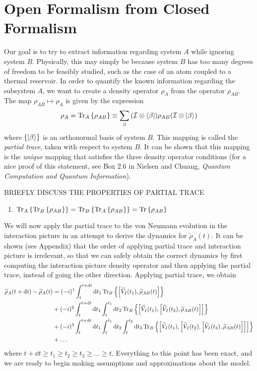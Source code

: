 \documentclass[aps, prl, preprint]{revtex4-1}
\newcommand{\ten}{\otimes}
\newcommand{\Tra}[1]{\Tr\left\{#1\right\}}
\newcommand{\Ptra}[2]{\Tr_{#1}\left\{#2\right\}}
\newcommand{\til}[1]{\widetilde{#1}}
\newcommand{\I}{\mathcal{I}}
\begin{document}
\section{Open Formalism from Closed Formalism}

Our goal is to try to extract information regarding system $A$ while ignoring system $B$. Physically, this may simply be because system $B$ has too many degrees of freedom to be feasibly studied, such as the case of an atom coupled to a thermal reservoir. In order to quantify the known information regarding the subsystem $A$, we want to create a density operator $\rho_A$ from the operator $\rho_{AB}$. The map $\rho_{AB}\mapsto\rho_A$ is given by the expression
\begin{equation}\label{ptra}
\rho_A = \Ptra{A}{\rho_{AB}}\equiv\sum_{\beta}\qty(\I\ten\bra{\beta})\rho_{AB}\qty(\I\ten\ket{\beta})
\end{equation}
where $\{\ket{\beta}\}$ is an orthonormal basis of system $B$. This mapping is called the \textit{partial trace}, taken with respect to system $B$. It can be shown that this mapping is the \textit{unique} mapping that satisfies the three density operator conditions (for a nice proof of this statement, see Box $2.6$ in Nielsen and Chuang, \textit{Quantum Computation and Quantum Information}).

BRIEFLY DISCUSS THE PROPERTIES OF PARTIAL TRACE
\begin{enumerate}
	\item $\Ptra{A}{\Ptra{B}{\rho_{AB}}} = \Ptra{B}{\Ptra{A}{\rho_{AB}}} = \Tra{\rho_{AB}}$
\end{enumerate}

We will now apply the partial trace to the von Neumann evolution in the interaction picture in an attempt to derive the dynamics for $\til{\rho}_A(t)$. It can be shown (see Appendix) that the order of applying partial trace and interaction picture is irrelevant, so that we can safely obtain the correct dynamics by first computing the interaction picture density operator and then applying the partial trace, instead of going the other direction. Applying partial trace, we obtain
\begin{align}\label{partintpert}
\begin{split}
\til{\rho}_{A}(t+\dd{t}) - \til{\rho}_{A}(t) &= (-i)^1\int_t^{t+\dd{t}}\dd{t_1}\Ptra{B}{\comm{\til{V}_I(t_1)}{\til{\rho}_{AB}(t)}}\\
&+(-i)^2\int_t^{t+\dd{t}}\dd{t_1}\int_t^{t_1}\dd{t_2}\Ptra{B}{\comm{\til{V}_I(t_1)}{\comm{\til{V}_I(t_2)}{\til{\rho}_{AB}(t)}}}\\
&+(-i)^3\int_t^{t+\dd{t}}\dd{t_1}\int_t^{t_1}\dd{t_2}\int_t^{t_2}\dd{t_3}\Ptra{B}{\comm{\til{V}_I(t_1)}{\comm{\til{V}_I(t_2)}{\comm{\til{V}_I(t_3)}{\til{\rho}_{AB}(t)}}}}\\
&+\ldots
\end{split}
\end{align}
where $t+\dd{t}\geq t_1\geq t_2\geq t_3\geq \ldots\geq t$. Everything to this point has been exact, and we are ready to begin making assumptions and approximations about the model.
\end{document}
